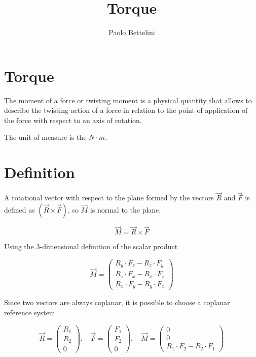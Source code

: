 \documentclass{article}
\title{Torque}
\author{Paolo Bettelini}
\date{}
\begin{document}
\maketitle
\tableofcontents
\pagebreak

\section{Torque}

The moment of a force or twisting moment is a physical quantity
that allows to describe the twisting action of a force in relation
to the point of application of the force with respect to an axis of rotation.

The unit of measure is the \(N\cdot m\).

\section{Definition}

A rotational vector with respect to the plane formed by the vectors
\(\vec{R}\) and \(\vec{F}\) is defined as \((\vec{R}\times\vec{F})\), so \(\vec{M}\) is normal to the plane.

\[
    \vec{M}=\vec{R}\times\vec{F}
\]

Using the \(3\)-dimensional definition of the scalar product

\[
    \vec{M}=
    \begin{pmatrix}
        R_y \cdot F_z - R_z \cdot F_y \\
        R_z \cdot F_x - R_x \cdot F_z \\
        R_x \cdot F_y - R_y \cdot F_x
    \end{pmatrix}
\]

Since two vectors are always coplanar, it is possible to choose a coplanar reference system

\[
    \vec{R}=
    \begin{pmatrix}
        R_1 \\
        R_2 \\
        0
    \end{pmatrix}
    ,\quad
    \vec{F}=
    \begin{pmatrix}
        F_1 \\
        F_2 \\
        0
    \end{pmatrix}
    ,\quad
    \vec{M}=
    \begin{pmatrix}
        0 \\
        0 \\
        R_1 \cdot F_2 - R_2 \cdot F_1
    \end{pmatrix}
\]
\end{document}
